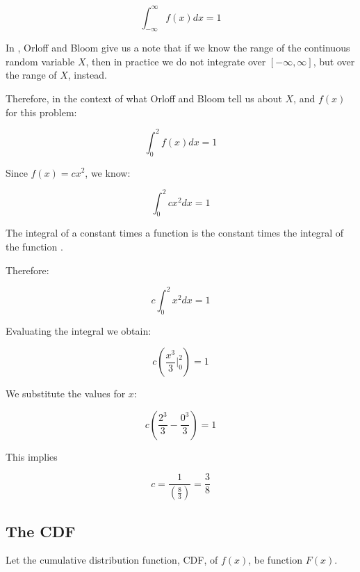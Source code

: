 \documentclass[a4paper,11pt]{article}
\begin{document}
\begin{equation}
  \int_{-\infty}^{\infty} f \left( x \right) dx = 1
\end{equation}

In \cite{reading5b}, Orloff and Bloom give us a note that if we know the range
of the continuous random variable $X$, then in practice we do not integrate
over $\left[ -\infty, \infty \right]$, but over the range of $X$, instead.

Therefore, in the context of what Orloff and Bloom tell us about $X$, and
$f \left(  x \right)$ for this problem:

\begin{equation}
  \int_{0}^{2} f \left( x \right) dx = 1
\end{equation}

Since $f \left( x \right) = cx^{2}$, we know:

\begin{equation}
  \int_{0}^{2}  cx^{2} dx = 1
\end{equation}

The integral of a constant times a function is the constant times the
integral of the function \cite{proofIntProps}.

Therefore:

\begin{equation}
  c \int_{0}^{2}  x^{2} dx = 1
\end{equation}

Evaluating the integral we obtain:

\begin{equation}
  c  \left( \frac{ x^{3}}{3}\bigg\rvert_{0}^{2} \right) = 1
\end{equation}

We substitute the values for $x$:

\begin{equation}
  c  \left( \frac{ 2^{3}}{3} - \frac{0^{3}}{3} \right) = 1
\end{equation}

This implies

\begin{equation}
  c  =  \frac{1}{\left( \frac{8}{3} \right)} = \frac{3}{8}
\end{equation}
\subsection{The CDF}

Let the cumulative distribution function, CDF, of $f\left( x \right)$, be
function $F\left(x\right)$.
\end{document}
